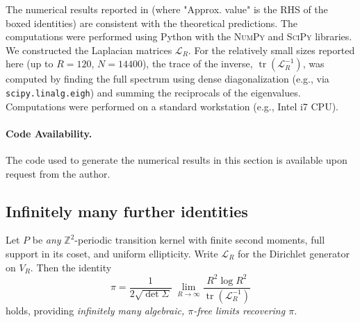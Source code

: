 \documentclass{article}
\numberwithin{equation}{section}
\theoremstyle{definition}
\theoremstyle{remark}
\DeclareMathOperator{\tr}{tr}
\begin{document}
The numerical results reported in  (where "Approx. value" is the RHS of the boxed identities) are consistent with the theoretical predictions. The computations were performed using Python with the \textsc{NumPy} and \textsc{SciPy} libraries. We constructed the Laplacian matrices $\mathcal{L}_R$.
For the relatively small sizes reported here (up to $R=120$, $N=14400$), the trace of the inverse, $\tr(\mathcal{L}_R^{-1})$, was computed by finding the full spectrum using dense diagonalization (e.g., via \texttt{scipy.linalg.eigh}) and summing the reciprocals of the eigenvalues. Computations were performed on a standard workstation (e.g., Intel i7 CPU).

\paragraph{Code Availability.} The code used to generate the numerical results in this section is available upon request from the author.


\subsection{Infinitely many further identities}\label{app:infinite}

Let \(P\) be \emph{any} $\mathbb{Z}^{2}$-periodic transition kernel
with finite second moments, full support in its coset, and
uniform ellipticity.
Write \( \mathcal{L}_R \) for the Dirichlet generator on \( V_R \).
Then the identity
\[\pi=\frac{1}{2\sqrt{\det\Sigma}}\;\lim_{R\to\infty}\frac{R^{2}\log R^{2}}{\tr(\mathcal{L}_R^{-1})}\]
holds, providing
\emph{infinitely many algebraic, $\pi$-free limits recovering $\pi$}.

 

\end{document}
